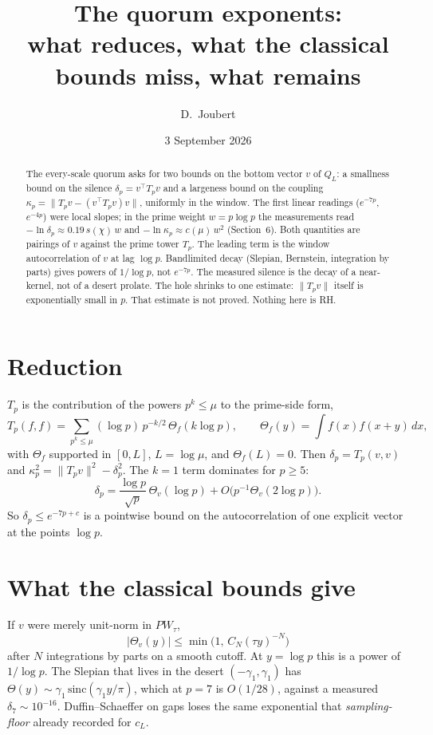 \documentclass[11pt]{article}
\title{The quorum exponents:\\ \large what reduces, what the classical bounds miss, what remains}
\author{D.\ Joubert}
\date{3 September 2026}
\theoremstyle{remark}\newtheorem*{remark}{Remark}
\begin{document}
\maketitle
\begin{abstract}
\noindent
The every-scale quorum asks for two bounds on the bottom vector $v$ of
$Q_L$: a smallness bound on the silence $\delta_p=v^{\!\top}T_pv$ and a largeness bound on the coupling $\kappa_p=\|T_pv-(v^{\!\top}T_pv)v\|$, uniformly in the window. The first linear readings ($e^{-7p}$, $e^{-4p}$) were local slopes; in the prime weight $w=p\log p$ the measurements read $-\ln\delta_p\approx0.19\,s(\chi)\,w$ and $-\ln\kappa_p\approx c(\mu)\,w^2$ (Section~6). Both quantities are pairings of $v$ against the prime tower
$T_p$. The leading term is the window autocorrelation of $v$ at lag
$\log p$. Bandlimited decay (Slepian, Bernstein, integration by parts)
gives powers of $1/\log p$, not $e^{-7p}$. The measured silence is the
decay of a near-kernel, not of a desert prolate. The hole shrinks to
one estimate: $\|T_pv\|$ itself is exponentially small in $p$. That
estimate is not proved. Nothing here is RH.
\end{abstract}

\section{Reduction}
$T_p$ is the contribution of the powers $p^k\le\mu$ to the prime-side
form,
\[
T_p(f,f)=\sum_{p^k\le\mu}(\log p)\,p^{-k/2}\,\Theta_f(k\log p),
\qquad
\Theta_f(y)=\int f(x)f(x+y)\,dx,
\]
with $\Theta_f$ supported in $[0,L]$, $L=\log\mu$, and $\Theta_f(L)=0$.
Then $\delta_p=T_p(v,v)$ and
$\kappa_p^2=\|T_pv\|^2-\delta_p^2$. The $k=1$ term dominates for
$p\ge5$:
\begin{equation}
\label{lead}
\delta_p=\frac{\log p}{\sqrt p}\,\Theta_v(\log p)+O\bigl(p^{-1}\Theta_v(2\log p)\bigr).
\end{equation}
So $\delta_p\le e^{-7p+c}$ is a pointwise bound on the autocorrelation
of one explicit vector at the points $\log p$.

\section{What the classical bounds give}
If $v$ were merely unit-norm in $PW_\tau$,
\[
|\Theta_v(y)|\le\min\bigl(1,\,C_N(\tau y)^{-N}\bigr)
\]
after $N$ integrations by parts on a smooth cutoff. At $y=\log p$ this
is a power of $1/\log p$. The Slepian that lives in the desert
$(-\gamma_1,\gamma_1)$ has
$\Theta(y)\sim\gamma_1\,\mathrm{sinc}(\gamma_1 y/\pi)$, which at
$p=7$ is $O(1/28)$, against a measured $\delta_7\sim10^{-16}$.
Duffin--Schaeffer on gaps loses the same exponential that
\emph{sampling-floor} already recorded for $c_L$.
\end{document}
